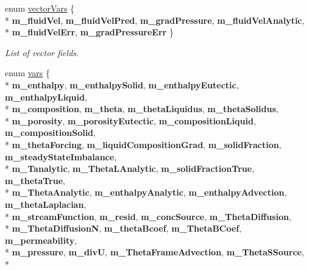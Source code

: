 \begin{DoxyCompactItemize}
\item 
enum \hyperlink{classamr_mushy_layer_a0cf5dc1675842f2dcb139ba40f1f0ba0}{vector\-Vars} \{ \\*
{\bfseries m\-\_\-fluid\-Vel}, 
{\bfseries m\-\_\-fluid\-Vel\-Pred}, 
{\bfseries m\-\_\-grad\-Pressure}, 
{\bfseries m\-\_\-fluid\-Vel\-Analytic}, 
\\*
{\bfseries m\-\_\-fluid\-Vel\-Err}, 
{\bfseries m\-\_\-grad\-Pressure\-Err}
 \}
\begin{DoxyCompactList}\small\item\em List of vector fields. \end{DoxyCompactList}\item 
enum \hyperlink{classamr_mushy_layer_af138d45c7c0bf1d7e7efe38f7de2da96}{vars} \{ \\*
{\bfseries m\-\_\-enthalpy}, 
{\bfseries m\-\_\-enthalpy\-Solid}, 
{\bfseries m\-\_\-enthalpy\-Eutectic}, 
{\bfseries m\-\_\-enthalpy\-Liquid}, 
\\*
{\bfseries m\-\_\-composition}, 
{\bfseries m\-\_\-theta}, 
{\bfseries m\-\_\-theta\-Liquidus}, 
{\bfseries m\-\_\-theta\-Solidus}, 
\\*
{\bfseries m\-\_\-porosity}, 
{\bfseries m\-\_\-porosity\-Eutectic}, 
{\bfseries m\-\_\-composition\-Liquid}, 
{\bfseries m\-\_\-composition\-Solid}, 
\\*
{\bfseries m\-\_\-theta\-Forcing}, 
{\bfseries m\-\_\-liquid\-Composition\-Grad}, 
{\bfseries m\-\_\-solid\-Fraction}, 
{\bfseries m\-\_\-steady\-State\-Imbalance}, 
\\*
{\bfseries m\-\_\-\-Tanalytic}, 
{\bfseries m\-\_\-\-Theta\-L\-Analytic}, 
{\bfseries m\-\_\-solid\-Fraction\-True}, 
{\bfseries m\-\_\-theta\-True}, 
\\*
{\bfseries m\-\_\-\-Theta\-Analytic}, 
{\bfseries m\-\_\-enthalpy\-Analytic}, 
{\bfseries m\-\_\-enthalpy\-Advection}, 
{\bfseries m\-\_\-theta\-Laplacian}, 
\\*
{\bfseries m\-\_\-stream\-Function}, 
{\bfseries m\-\_\-resid}, 
{\bfseries m\-\_\-conc\-Source}, 
{\bfseries m\-\_\-\-Theta\-Diffusion}, 
\\*
{\bfseries m\-\_\-\-Theta\-Diffusion\-N}, 
{\bfseries m\-\_\-theta\-Bcoef}, 
{\bfseries m\-\_\-\-Theta\-B\-Coef}, 
{\bfseries m\-\_\-permeability}, 
\\*
{\bfseries m\-\_\-pressure}, 
{\bfseries m\-\_\-div\-U}, 
{\bfseries m\-\_\-\-Theta\-Frame\-Advection}, 
{\bfseries m\-\_\-\-Theta\-S\-Source}, 
\\*

\end{DoxyCompactItemize}
